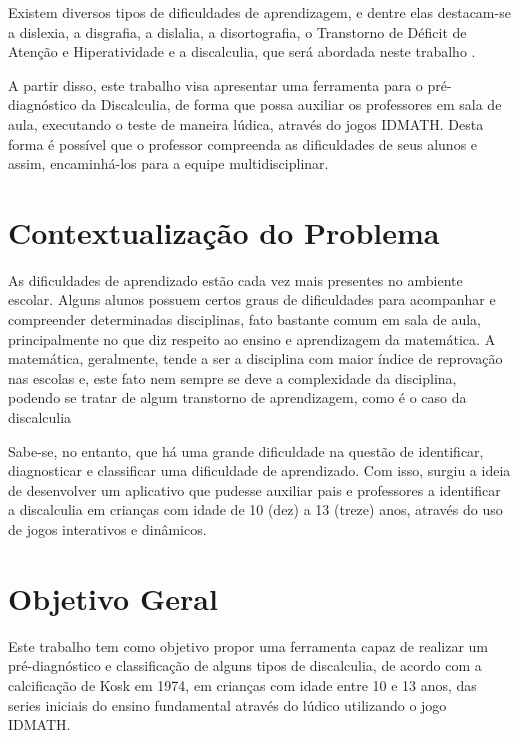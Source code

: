 \documentclass[
	12pt,				%
    oneside,			%
	a4paper,			%
	english,			%
	french,				%
	spanish,			%
	brazil,				%
	]{abntex2}
\begin{document}
Existem diversos tipos de dificuldades de aprendizagem, e dentre elas destacam-se a dislexia, a disgrafia, a dislalia, a disortografia, o Transtorno de Déficit de Atenção e Hiperatividade e a discalculia, que será abordada neste trabalho \cite{Barros}.

A partir disso, este trabalho visa apresentar uma ferramenta para o pré-diagnóstico da Discalculia, de forma que possa auxiliar os professores em sala de aula, executando o teste de maneira lúdica, através do jogos IDMATH. Desta forma é possível que o professor compreenda as dificuldades de seus alunos e assim, encaminhá-los para a equipe multidisciplinar.








\section{Contextualização do Problema}

As dificuldades de aprendizado estão cada vez mais presentes no ambiente escolar. Alguns alunos possuem certos graus de dificuldades para acompanhar e compreender determinadas disciplinas, fato bastante comum em sala de aula, principalmente no que diz respeito ao ensino e aprendizagem da matemática. A matemática, geralmente, tende a ser a disciplina com maior índice de reprovação nas escolas e, este fato nem sempre se deve a complexidade da disciplina, podendo se tratar de algum transtorno de aprendizagem, como é o caso da discalculia \cite{Almeida}

Sabe-se, no entanto, que há uma grande dificuldade na questão de identificar, diagnosticar e classificar uma dificuldade de aprendizado. Com isso, surgiu a ideia de desenvolver um aplicativo que pudesse auxiliar pais e professores a identificar a discalculia em crianças com idade de 10 (dez) a 13 (treze) anos, através do uso de jogos interativos e dinâmicos.


\section{Objetivo Geral}

Este trabalho tem como objetivo propor uma ferramenta capaz de realizar um pré-diagnóstico e classificação de alguns tipos de discalculia, de acordo com a calcificação de Kosk em 1974, em crianças com idade entre 10 e 13 anos, das series iniciais do ensino fundamental através do lúdico utilizando o jogo IDMATH. 
\end{document}
